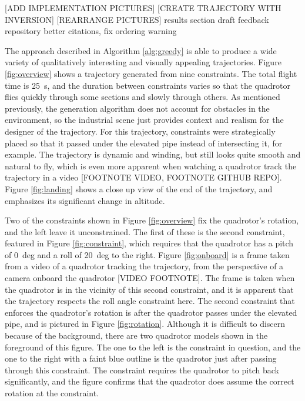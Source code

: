 \documentclass[pageno]{jpaper}
\begin{document}
[ADD IMPLEMENTATION PICTURES]
[CREATE TRAJECTORY WITH INVERSION]
[REARRANGE PICTURES]
results section
draft feedback
repository
better citations, fix ordering warning

The approach described in Algorithm \ref{alg:greedy} is able to produce a wide variety of qualitatively interesting and visually appealing trajectories. Figure \ref{fig:overview} shows a trajectory generated from nine constraints. The total flight time is \qty{25}{s}, and the duration between constraints varies so that the quadrotor flies quickly through some sections and slowly through others. As mentioned previously, the generation algorithm does not account for obstacles in the environment, so the industrial scene just provides context and realism for the designer of the trajectory. For this trajectory, constraints were strategically placed so that it passed under the elevated pipe instead of intersecting it, for example. The trajectory is dynamic and winding, but still looks quite smooth and natural to fly, which is even more apparent when watching a quadrotor track the trajectory in a video [FOOTNOTE VIDEO, FOOTNOTE GITHUB REPO]. Figure \ref{fig:landing} shows a close up view of the end of the trajectory, and emphasizes its significant change in altitude.

Two of the constraints shown in Figure \ref{fig:overview} fix the quadrotor's rotation, and the left leave it unconstrained. The first of these is the second constraint, featured in Figure \ref{fig:constraint}, which requires that the quadrotor has a pitch of \qty{0}{deg} and a roll of \qty{20}{deg} to the right. Figure \ref{fig:onboard} is a frame taken from a video of a quadrotor tracking the trajectory, from the perspective of a camera onboard the quadrotor [VIDEO FOOTNOTE]. The frame is taken when the quadrotor is in the vicinity of this second constraint, and it is apparent that the trajectory respects the roll angle constraint here. The second constraint that enforces the quadrotor's rotation is after the quadrotor passes under the elevated pipe, and is pictured in Figure \ref{fig:rotation}. Although it is difficult to discern because of the background, there are two quadrotor models shown in the foreground of this figure. The one to the left is the constraint in question, and the one to the right with a faint blue outline is the quadrotor just after passing through this constraint. The constraint requires the quadrotor to pitch back significantly, and the figure confirms that the quadrotor does assume the correct rotation at the constraint.
\end{document}
